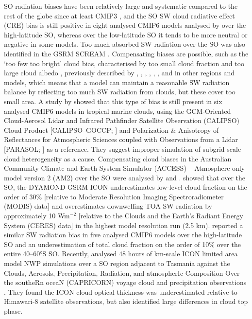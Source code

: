 \documentclass[12pt,a4paper]{article}
\begin{document}
SO radiation biases have been relatively large and systematic compared to the
rest of the globe since at least CMIP3 \citep{trenberth2010}, and the SO SW
cloud radiative effect (CRE) bias is still positive in eight analysed CMIP6
models analysed by \cite{schuddeboom2021} over the high-latitude SO, whereas
over the low-latitude SO it tends to be more neutral or negative in some
models. Too much absorbed SW radiation over the SO was also identified in the
GSRM SCREAM \cite{caldwell2021}. Compensating biases are possible, such as the
`too few too bright' cloud bias, characterised by too small cloud fraction and
too large cloud albedo \citep{wall2017,kuma2020}, previously described by
\cite{webb2001}, \cite{weare2004}, \cite{zhang2005}, \cite{karlsson2008},
\cite{nam2012}, \cite{klein2013}, and \cite{bender2017} in other regions and
models, which means that a model can maintain a reasonable SW radiation balance
by reflecting too much SW radiation from clouds, but these cover too small
area. A study by \cite{konsta2022} showed that this type of bias is still
present in six analysed CMIP6 models in tropical marine clouds, using the
GCM-Oriented Cloud-Aerosol Lidar and Infrared Pathfinder Satellite Observation
(CALIPSO) Cloud Product [CALIPSO--GOCCP; \cite{chepfer2010}] and Polarization
\& Anisotropy of Reflectances for Atmospheric Sciences coupled with
Observations from a Lidar [PARASOL; \cite{lier2008}] as a reference. They
suggest improper simulation of subgrid-scale cloud heterogeneity as a cause.
Compensating cloud biases in the Australian Community Climate and Earth System
Simulator (ACCESS) – Atmosphere-only model version 2 (AM2) over the SO were
analysed by \cite{fiddes2022} and \cite{fiddes2024}.  \cite{possner2022} showed
that over the SO, the DYAMOND GSRM ICON underestimates low-level cloud fraction
on the order of 30\% [relative to Moderate Resolution Imaging Spectroradiometer
(MODIS) data] and overestimates downwelling TOA SW radiation by approximately
10 Wm$^\mathrm{-2}$ [relative to the Clouds and the Earth’s Radiant Energy
System (CERES) data] in the highest model resolution run (2.5 km).
\cite{zhao2022} reported a similar SW radiation bias in five analysed CMIP6
models over the high-latitude SO and an underestimation of total cloud fraction on
the order of 10\% over the entire 40--60°S SO. Recently, \cite{ramadoss2024}
analysed 48 hours of km-scale ICON limited area model NWP simulations over a SO
region adjacent to Tasmania against the Clouds, Aerosols, Precipitation,
Radiation, and atmospherIc Composition Over the southeRn oceaN (CAPRICORN)
voyage cloud and precipitation observations \cite{mcfarquhar2021}. They found
the ICON cloud optical thickness was underestimated relative to Himawari‐8
satellite observations, but also identified large differences in cloud top
phase.
\end{document}
